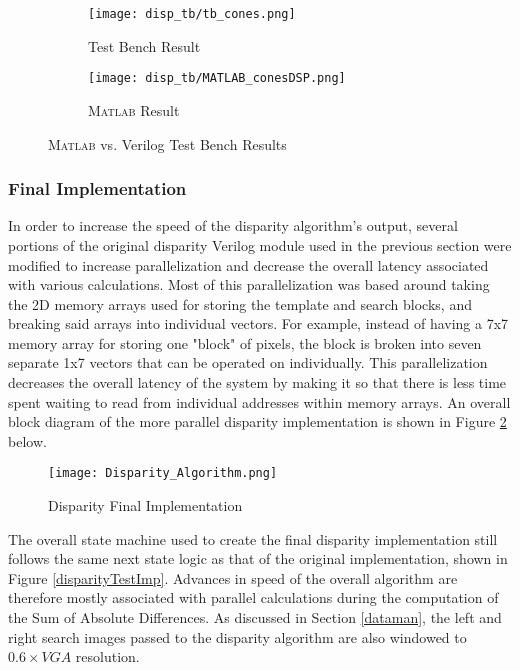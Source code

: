 \par
\begin{figure}[H] 
         \begin{subfigure}[h]{0.5\textwidth}
              \centerline{\texttt{[image: disp\_tb/tb\_cones.png]}}
             \caption{Test Bench Result}
         \end{subfigure}
         \begin{subfigure}[h]{0.5\textwidth}
             \centerline{\texttt{[image: disp\_tb/MATLAB\_conesDSP.png]}}
             \caption{\textsc{Matlab} Result}
         \end{subfigure}
\caption{\textsc{Matlab} vs. Verilog Test Bench Results}
\label{disparityVerilogvsMatlab}
\end{figure}


\subsubsection{Final Implementation}
In order to increase the speed of the disparity algorithm's output, several portions of the original disparity Verilog module used in the previous section were modified to increase parallelization and decrease the overall latency associated with various calculations. Most of this parallelization was based around taking the 2D memory arrays used for storing the template and search blocks, and breaking said arrays into individual vectors. For example, instead of having a 7x7 memory array for storing one "block" of pixels, the block is broken into seven separate 1x7 vectors that can be operated on individually. This parallelization decreases the overall latency of the system by making it so that there is less time spent waiting to read from individual addresses within memory arrays. An overall block diagram of the more parallel disparity implementation is shown in Figure \ref{disparityFinalImp} below. 
\par
\begin{figure}[H]
	\centerline{\texttt{[image: Disparity\_Algorithm.png]}}
	\caption{Disparity Final Implementation}
	\label{disparityFinalImp}
\end{figure}
\par
The overall state machine used to create the final disparity implementation still follows the same next state logic as that of the original implementation, shown in Figure \ref{disparityTestImp}. Advances in speed of the overall algorithm are therefore mostly associated with parallel calculations during the computation of the Sum of Absolute Differences. As discussed in Section \ref{dataman}, the left and right search images passed to the disparity algorithm are also windowed to $0.6\times{}VGA$ resolution. 
